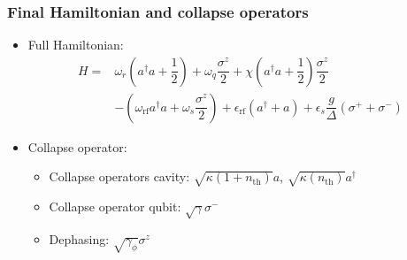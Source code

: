 \documentclass[xcolor=dvipsnames,hyperref={CJKbookmarks=true}]{beamer}
\newcommand{\rf}{\text{rf}}
\newcommand{\thm}{\text{th}}
\begin{document}
\begin{frame}
\frametitle{Final Hamiltonian and collapse operators}
\begin{itemize}
	\item Full Hamiltonian: 
\begin{align*}
H =& \omega_r \left(a^{\dagger} a+ \dfrac{1}{2} \right) +  \omega_q \dfrac{\sigma^{z}}{2}+ \chi \left(a^{\dagger}a+\dfrac{1}{2} \right)\dfrac{\sigma^{z}}{2}\\
& - \left( \omega_{\rf}a^{\dagger}a +\omega_s \dfrac{\sigma^{z}}{2} \right) + \epsilon_{\rf}\left(a^{\dagger}+a\right) 
+  \epsilon_{s}\dfrac{g}{\Delta}\left(\sigma^{+}+\sigma^{-} \right)
\end{align*}
	\item Collapse operator: 
	\begin{itemize}
		\item  Collapse operators cavity: 
		$\sqrt{\kappa \left(1+n_{\thm} \right)}a$, 
		$\sqrt{\kappa \left(n_{\thm} \right)}a^{\dagger}$
		\item Collapse operator qubit:  
		$\sqrt{\gamma}\sigma^{-}$
		\item Dephasing: 
		$\sqrt{\gamma_{\phi}}\sigma^{z}$
	\end{itemize}
\end{itemize}
\end{frame}

\end{document}
